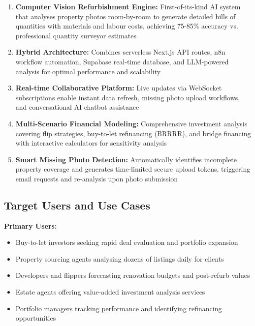 \documentclass[11pt,a4paper]{article}
\begin{document}
\begin{enumerate}
  \item \textbf{Computer Vision Refurbishment Engine:} First-of-its-kind AI system that analyses property photos room-by-room to generate detailed bills of quantities with materials and labour costs, achieving 75-85\% accuracy vs. professional quantity surveyor estimates

  \item \textbf{Hybrid Architecture:} Combines serverless Next.js API routes, n8n workflow automation, Supabase real-time database, and LLM-powered analysis for optimal performance and scalability

  \item \textbf{Real-time Collaborative Platform:} Live updates via WebSocket subscriptions enable instant data refresh, missing photo upload workflows, and conversational AI chatbot assistance

  \item \textbf{Multi-Scenario Financial Modeling:} Comprehensive investment analysis covering flip strategies, buy-to-let refinancing (BRRRR), and bridge financing with interactive calculators for sensitivity analysis

  \item \textbf{Smart Missing Photo Detection:} Automatically identifies incomplete property coverage and generates time-limited secure upload tokens, triggering email requests and re-analysis upon photo submission
\end{enumerate}

\subsection{Target Users and Use Cases}

\textbf{Primary Users:}
\begin{itemize}
  \item Buy-to-let investors seeking rapid deal evaluation and portfolio expansion
  \item Property sourcing agents analysing dozens of listings daily for clients
  \item Developers and flippers forecasting renovation budgets and post-refurb values
  \item Estate agents offering value-added investment analysis services
  \item Portfolio managers tracking performance and identifying refinancing opportunities
\end{itemize}
\end{document}
